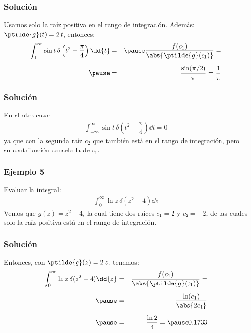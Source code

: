 \begin{frame}
\frametitle{Solución}
Usamos solo la raíz positiva en el rango de integración. Además: $\ptilde{g}(t) =  2 \, t$, entonces: \pause
\begin{eqnarray*}
\int_{1}^{\infty} \sin t \, \delta \left( t^{2} - \dfrac{\pi}{4} \right) \dd{t} &=& \pause \dfrac{f(c_{1})}{\abs{\ptilde{g}(c_{1})}} = \\[0.5em] \pause
&=& \dfrac{\sin (\pi/2)}{\pi} = \dfrac{1}{\pi}
\end{eqnarray*}
\end{frame}
\begin{frame}
\frametitle{Solución}
En el otro caso:
\begin{align*}
\int_{-\infty}^{\infty} \sin t \, \delta \left( t^{2} - \dfrac{\pi}{4} \right) \dd{t} = 0
\end{align*}
\pause
ya que con la segunda raíz $c_{2}$ que también está en el rango de integración, pero su contribución cancela la de $c_{1}$.
\end{frame}
\begin{frame}
\frametitle{Ejemplo 5}
Evaluar la integral:
\begin{align*}
\int_{0}^{\infty} \ln z \, \delta (z^{2} - 4 ) \dd{z}
\end{align*}
\pause
Vemos que $g(z) = z^{2} - 4$, la cual tiene dos raíces $c_{1} = 2$ y $c_{2} = -2$, de las cuales solo la raíz positiva está en el rango de integración.
\end{frame}
\begin{frame}
\frametitle{Solución}
Entonces, con $\ptilde{g}(z) = 2 \, z$, tenemos:
\begin{eqnarray*}
\int_{0}^{\infty} \ln z \, \delta (z^{2} - 4 ) \dd{z} &=& \dfrac{f(c_{1})}{\abs{\ptilde{g}(c_{1})}} = \\[0.5em] \pause
&=& \dfrac{\ln (c_{1})}{\abs{2 c_{1}}} \\[0.5em] \pause
&=& \dfrac{\ln 2}{4} = \pause 0.1733
\end{eqnarray*}
\end{frame}
